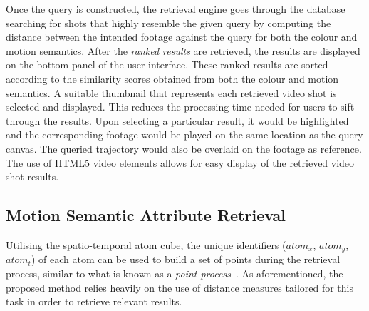 Once the query is constructed, the retrieval engine goes through the database searching for shots that highly resemble the given query by computing the distance between the intended footage against the query for both the colour and motion semantics. 
After the \emph{ranked results} are retrieved, the results are displayed on the bottom panel of the user interface. 
These ranked results are sorted according to the similarity scores obtained from both the colour and motion semantics.
A suitable thumbnail that represents each retrieved video shot is selected and displayed. This reduces the processing time needed for users to sift through the results.
Upon selecting a particular result, it would be highlighted and the corresponding footage would be played on the same location as the query canvas. 
The queried trajectory would also be overlaid on the footage as reference.
The use of HTML5 video elements allows for easy display of the retrieved video shot results.


\subsection{Motion Semantic Attribute Retrieval}
\label{section:motionretrieval}

Utilising the spatio-temporal atom cube, the unique identifiers ($atom_x$, $atom_y$, $atom_t$) of each atom can be used to build a set of points during the retrieval process, similar to what is known as a \emph{point process}~\cite{diggle2013statistical}. As aforementioned, the proposed method relies heavily on the use of distance measures tailored for this task in order to retrieve relevant results.

